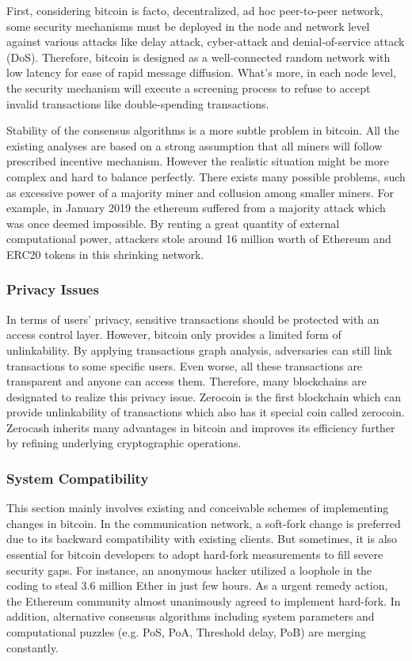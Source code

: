 \documentclass[conference]{IEEEtran}
\begin{document}
First, considering bitcoin is facto, decentralized, ad hoc peer-to-peer network, some security mechanisms must be deployed in the node and network level against various attacks like delay attack, cyber-attack and denial-of-service attack (DoS).
%
Therefore, bitcoin is designed as a well-connected random network with low latency for ease of rapid message diffusion. 
%
What's more, in each node level, the security mechanism will execute a screening process to refuse to accept invalid transactions like double-spending transactions.

Stability of the consensus algorithms is a more subtle problem in bitcoin.
%
All the existing analyses are based on a strong assumption that all miners will follow prescribed incentive mechanism.
%
However the realistic situation might be more complex and hard to balance perfectly.
%
There exists many possible problems, such as excessive power of a majority miner and collusion among smaller miners.
%
For example, in January 2019 the ethereum\cite{wood2014ethereum} suffered from a majority attack which was once deemed impossible.
%
By renting a great quantity of external computational power, attackers stole around 16 million worth of Ethereum and ERC20 tokens in this shrinking network.

\subsubsection{Privacy Issues}
In terms of users' privacy, sensitive transactions should be protected with an access control layer. 
%
However, bitcoin only provides a limited form of unlinkability.
%
By applying transactions graph analysis, adversaries can still link transactions to some specific users.
%
Even worse, all these transactions are transparent and anyone can access them.
%
Therefore, many blockchains are designated to realize this privacy issue. 
%
Zerocoin\cite{miers2013zerocoin} is the first blockchain which can provide unlinkability of transactions which also has it special coin called zerocoin.
%
Zerocash\cite{sasson2014zerocash} inherits many advantages in bitcoin and improves its efficiency further by refining underlying cryptographic operations.


\subsubsection{System Compatibility}
This section mainly involves existing and conceivable schemes of implementing changes in bitcoin.
%
In the communication network, a soft-fork change is preferred due to its backward compatibility with existing clients.
%
But sometimes, it is also essential for bitcoin developers to adopt hard-fork measurements to fill severe security gaps.
%
For instance, an anonymous hacker utilized a loophole in the coding to steal 3.6 million Ether in just few hours. 
%
As a urgent remedy action, the Ethereum community almost unanimously agreed to implement hard-fork. 
%
In addition, alternative consensus algorithms including system parameters and computational puzzles (e.g. PoS\cite{king2012ppcoin}, PoA\cite{gunnam2008next}, Threshold delay\cite{Dfinity}, PoB\cite{Slimcoin}) are merging constantly.  
\end{document}
